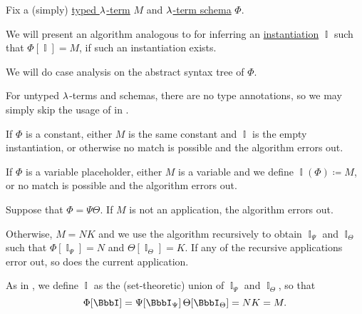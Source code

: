 \begin{algorithm}\label{alg:lambda_term_schema_inference}
  Fix a (simply) \hyperref[def:typed_lambda_term]{typed \( {\mathrm \lambda} \)-term} \( M \) and \hyperref[def:lambda_term_schema]{\( {\mathrm \lambda} \)-term schema} \( \Phi \).

  We will present an algorithm analogous to  for inferring an \hyperref[def:lambda_schema_instantiation]{instantiation} \( \BbbI \) such that \( \Phi[\BbbI] = M \), if such an instantiation exists.

  We will do case analysis on the abstract syntax tree of \( \Phi \).

  For untyped \( {\mathrm \lambda} \)-terms and schemas, there are no type annotations, so we may simply skip the usage of  in .

  \begin{thmenum}
     If \( \Phi \) is a constant, either \( M \) is the same constant and \( \BbbI \) is the empty instantiation, or otherwise no match is possible and the algorithm errors out.

     If \( \Phi \) is a variable placeholder, either \( M \) is a variable and we define \( \BbbI(\Phi) \coloneqq M \), or no match is possible and the algorithm errors out.

     Suppose that \( \Phi = \Psi \Theta \). If \( M \) is not an application, the algorithm errors out.

    Otherwise, \( M = NK \) and we use the algorithm recursively to obtain \( \BbbI_\Psi \) and \( \BbbI_\Theta \) such that \( \Phi[\BbbI_\Psi] = N \) and \( \Theta[\BbbI_\Theta] = K \). If any of the recursive applications error out, so does the current application.

    As in , we define \( \BbbI \) as the (set-theoretic) union of \( \BbbI_\Psi \) and \( \BbbI_\Theta \), so that
    \begin{equation*}
      \Phi[\BbbI] = \Psi[\BbbI_\Psi] \thinspace \Theta[\BbbI_\Theta] = N K = M.
    \end{equation*}


\end{thmenum}
\end{algorithm}
